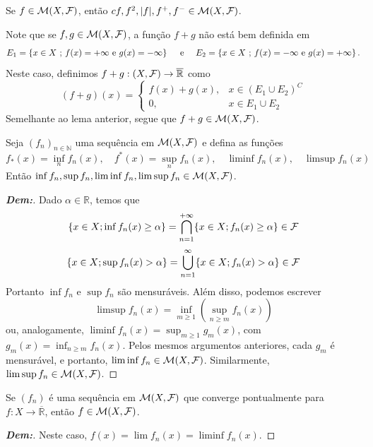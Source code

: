 \begin{corollary*}{}
 Se $f \in \mathcal{M}(X,\mathcal{F})$, então $cf, f^2, |f|, f^+, f^- \in \mathcal{M}(X,\mathcal{F})$. 
\end{corollary*}
\noindent
Note que se $f, g \in \mathcal{M}(X,\mathcal{F})$, a função $f + g$ não está bem definida em 
\begin{align*}
  E_1 = \left\{x \in X \text{ ; } f(x)=+\infty\text{ e } g(x)=-\infty\right\}\quad \text{ e } 
  \quad 
  E_2 = \left\{x \in X \text{ ; } f(x) = -\infty \text{ e } g(x) = + \infty\right\}.
\end{align*}
Neste caso, definimos $f+g: (X,\mathcal{F}) \rightarrow \overline{\mathbb{R}}$ como %
$$ (f+g)(x) = \begin{cases} 
  f(x) + g(x), & x \in (E_1 \cup E_2)^C \\ 
0, & x \in E_1 \cup E_2
\end{cases} $$ %
Semelhante ao lema anterior, segue que $f+g \in \mathcal{M}(X,\mathcal{F})$. %
\begin{lemma*}{}
   Seja $(f_n)_{n \in \mathbb{N}}$ uma 
   sequência em $\mathcal{M}(X,\mathcal{F})$ e defina as funções %
$$ f_*(x) = \inf_n f_n(x), \quad f^*(x) = \sup_n f_n(x), \quad \liminf f_n(x), \quad \limsup f_n(x) $$ %
Então $\inf f_n, \sup f_n, \liminf f_n, \limsup f_n \in \mathcal{M}(X,\mathcal{F})$. %
\end{lemma*}
\begin{proof}[\textbf{Dem:}]
Dado $\alpha \in \mathbb{R}$, temos que %
$$ \{x \in X; \inf f_n(x) \ge \alpha\} = \bigcap_{n=1}^{+\infty} \{x \in X; f_n(x) \ge \alpha\} \in \mathcal{F} $$ %
$$ \{x \in X; \sup f_n(x) > \alpha\} = \bigcup_{n=1}^{\infty} \{x \in X; f_n(x) > \alpha\} \in \mathcal{F} $$ %
Portanto $\inf f_n$ e $\sup f_n$ são mensuráveis. Além disso, podemos escrever %
$$ \limsup f_n(x) = \inf_{m \ge 1} \left( \sup_{n \ge m} f_n(x) \right) $$ %
ou, analogamente, $\liminf f_n(x) = \sup_{m \ge 1} g_m(x)$, com $g_m(x) = \inf_{n \ge m} f_n(x)$. Pelos mesmos argumentos anteriores, cada $g_m$ é mensurável, %
e portanto, $\liminf f_n \in \mathcal{M}(X,\mathcal{F})$. Similarmente, $\limsup f_n \in \mathcal{M}(X,\mathcal{F})$. %
\end{proof}

\begin{corollary*}{}
  Se $(f_n)$ é uma sequência em $\mathcal{M}(X,\mathcal{F})$ que converge
  pontualmente para $f:X \rightarrow \overline{\mathbb{R}}$,
  então $f \in \mathcal{M}(X,\mathcal{F})$. 
\end{corollary*}
\begin{proof}[\textbf{Dem:}]
 Neste caso, $f(x) = \lim f_n(x) = \liminf f_n(x)$. %
\end{proof}

